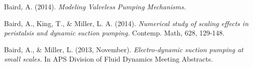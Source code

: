 \begin{cventries}
{\begin{cvitems}
        \item{ Baird, A. (2014). \textit{Modeling Valveless Pumping Mechanisms.}}
        \item{ Baird, A., King, T., \& Miller, L. A. (2014). \textit{Numerical study of scaling effects in peristalsis and dynamic suction pumping.} Contemp. Math, 628, 129-148.}
        \item{Baird, A., \& Miller, L. (2013, November). \textit{Electro-dynamic suction pumping at small scales.} In APS Division of Fluid Dynamics Meeting Abstracts.}
      \end{cvitems}
    }
\end{cventries}
\pagebreak